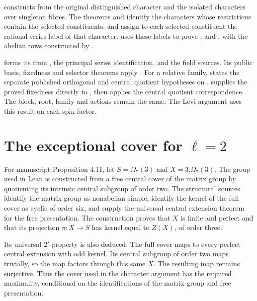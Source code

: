 \begin{implementation}
 constructs
 from the original distinguished character and the
isolated characters over singleton fibres. The theorems
 and
 identify the characters whose restrictions contain the selected constituents.  and  assign to each selected constituent the rational series label of that character.
 uses these labels to prove
,  and
, with the abelian rows constructed by .

 forms its
 from , the principal series
identification,  and the field sources.
Its public basis, fixedness and selector theorems apply
. For a relative family,
 states the separate published orthogonal
and central quotient hypotheses on .
 supplies the proved
fixedness directly to , then applies
the central quotient correspondence. The block, root, family and
actions remain the same. The Levi argument uses this result on each
spin factor.
\end{implementation}

\section{The exceptional cover for \texorpdfstring{$\ell=2$}{ell=2}}

For manuscript Proposition 4.11, let $S=\Omega_7(3)$ and
$X=3.\Omega_7(3)$. The group used in Lean is constructed from a free
central cover of the matrix group by quotienting its intrinsic
central subgroup of order two. The structural sources identify the
matrix group as nonabelian simple, identify the kernel of the full cover as
cyclic of order six, and supply the universal central extension theorem
for the free presentation. The construction proves that $X$ is finite
and perfect and that its projection $\pi:X\longrightarrow S$
has kernel equal to $Z(X)$, of order three.

Its universal $2'$-property is also deduced. The full cover maps to
every perfect central extension with odd kernel. Its central subgroup
of order two maps trivially, so the map factors through this same $X$.
The resulting map remains surjective. Thus the cover used in the
character argument has the required maximality, conditional on the
identifications of the matrix group and free presentation.

